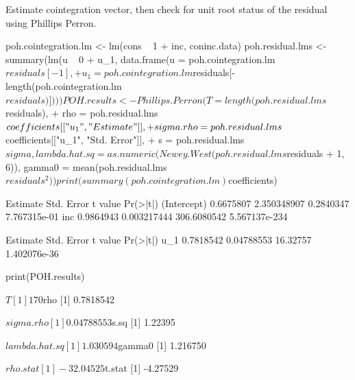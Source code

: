 \documentclass[a4paper]{article}
\begin{document}
Estimate cointegration vector, then check for unit root status of the residual using Phillips Perron.
\begin{Schunk}
\begin{Sinput}
 poh.cointegration.lm <- lm(cons ~ 1 + inc, coninc.data)
 poh.residual.lms <- summary(lm(u ~ 0 + u_1, data.frame(u = poh.cointegration.lm$residuals[-1], 
+     u_1 = poh.cointegration.lm$residuals[-length(poh.cointegration.lm$residuals)])))
 POH.results <- Phillips.Perron(T = length(poh.residual.lms$residuals), 
+     rho = poh.residual.lms$coefficients[["u_1", "Estimate"]], 
+     sigma.rho = poh.residual.lms$coefficients[["u_1", "Std. Error"]], 
+     s = poh.residual.lms$sigma, lambda.hat.sq = as.numeric(Newey.West(poh.residual.lms$residuals %
+         1, 6)), gamma0 = mean(poh.residual.lms$residuals^2))
 print(summary(poh.cointegration.lm)$coefficients)
\end{Sinput}
\begin{Soutput}
             Estimate  Std. Error     t value      Pr(>|t|)
(Intercept) 0.6675807 2.350348907   0.2840347  7.767315e-01
inc         0.9864943 0.003217444 306.6080542 5.567137e-234
\end{Soutput}
\begin{Soutput}
     Estimate Std. Error  t value     Pr(>|t|)
u_1 0.7818542 0.04788553 16.32757 1.402076e-36
\end{Soutput}
\begin{Sinput}
 print(POH.results)
\end{Sinput}
\begin{Soutput}
$T
[1] 170

$rho
[1] 0.7818542

$sigma.rho
[1] 0.04788553

$s.sq
[1] 1.22395

$lambda.hat.sq
[1] 1.030594

$gamma0
[1] 1.216750

$rho.stat
[1] -32.04525

$t.stat
[1] -4.27529
\end{Soutput}
\end{Schunk}
\end{document}
